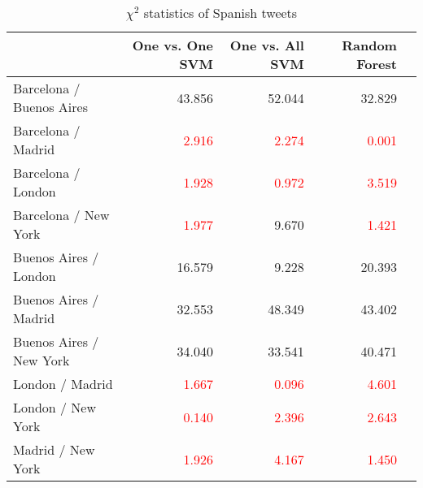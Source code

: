 \begin{table}[ht]
	\caption{$\chi^2$ statistics of Spanish tweets}
	\begin{tabular}{|l|r|r|r|r|} \hline
	{}&One vs. One SVM &One vs. All SVM&Random Forest\\ \hline
	Barcelona / Buenos Aires& 43.856& 52.044 & 32.829 \\ \hline
	Barcelona / Madrid &\textcolor{red}{2.916} &\textcolor{red}{2.274}  & \textcolor{red}{0.001}\\ \hline
	Barcelona / London & \textcolor{red}{1.928} & \textcolor{red}{0.972}  & \textcolor{red}{3.519} \\ \hline
	Barcelona / New York & \textcolor{red}{1.977} & 9.670 &  \textcolor{red}{1.421} \\ \hline
	Buenos Aires / London & 16.579 & 9.228 & 20.393 \\ \hline
	Buenos Aires / Madrid & 32.553& 48.349& 43.402 \\ \hline
	Buenos Aires / New York & 34.040 & 33.541  & 40.471 \\ \hline
	London / Madrid & \textcolor{red}{1.667} & \textcolor{red}{0.096} & \textcolor{red}{4.601} \\ \hline
	London / New York & \textcolor{red}{0.140}  & \textcolor{red}{ 2.396}  & \textcolor{red}{2.643} \\ \hline
	Madrid / New York & \textcolor{red}{1.926} & \textcolor{red}{ 4.167} & \textcolor{red}{1.450} \\ \hline
	\end{tabular}
	\label{tab:result_chi_es}
\end{table}




